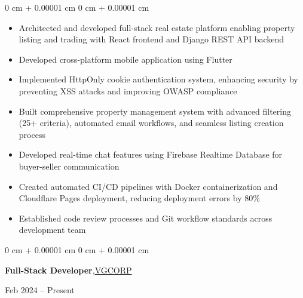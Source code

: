\documentclass[10pt, letterpaper]{article}
\newenvironment{highlights}{
    \begin{itemize}[
        topsep=0.10 cm,
        parsep=0.10 cm,
        partopsep=0pt,
        itemsep=0pt,
        leftmargin=0 cm + 10pt
    ]
}{
    \end{itemize}
} %
\newenvironment{onecolentry}{
    \begin{adjustwidth}{
        0 cm + 0.00001 cm
    }{
        0 cm + 0.00001 cm
    }
}{
    \end{adjustwidth}
} %
\newenvironment{twocolentry}[2][]{
    \onecolentry
    \def\secondColumn{#2}
    \setcolumnwidth{\fill, 4.5 cm}
    \begin{paracol}{2}
}{
    \switchcolumn \raggedleft \secondColumn
    \end{paracol}
    \endonecolentry
} %
\begin{document}
        \vspace{0.15 cm}
        \begin{onecolentry}
            \begin{highlights}
                \item Architected and developed full-stack real estate platform enabling property listing and trading with React frontend and Django REST API backend
                \item Developed cross-platform mobile application using Flutter
                \item Implemented HttpOnly cookie authentication system, enhancing security by preventing XSS attacks and improving OWASP compliance
                \item Built comprehensive property management system with advanced filtering (25+ criteria), automated email workflows, and seamless listing creation process
                \item Developed real-time chat features using Firebase Realtime Database for buyer-seller communication
                \item Created automated CI/CD pipelines with Docker containerization and Cloudflare Pages deployment, reducing deployment errors by 80\%
                \item Established code review processes and Git workflow standards across development team
            \end{highlights}
        \end{onecolentry}

        \vspace{0.2 cm}

        \begin{twocolentry}{
            Feb 2024 – Present
        }   
            \textbf{Full-Stack Developer},\href{https://www.vgcorp.vn}{VGCORP}
        \end{twocolentry}
\end{document}

